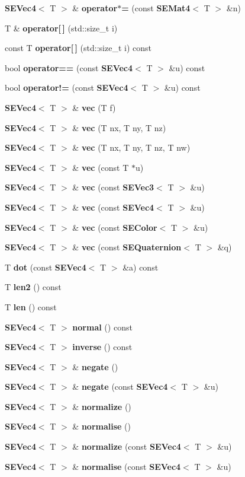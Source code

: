 \begin{DoxyCompactItemize}
\item 
{\bf S\+E\+Vec4}$<$ T $>$ \& {\bf operator$\ast$=} (const {\bf S\+E\+Mat4}$<$ T $>$ \&n)
\item 
T \& {\bf operator[$\,$]} (std\+::size\+\_\+t i)
\item 
const T {\bf operator[$\,$]} (std\+::size\+\_\+t i) const 
\item 
bool {\bf operator==} (const {\bf S\+E\+Vec4}$<$ T $>$ \&u) const 
\item 
bool {\bf operator!=} (const {\bf S\+E\+Vec4}$<$ T $>$ \&u) const 
\item 
{\bf S\+E\+Vec4}$<$ T $>$ \& {\bf vec} (T f)
\item 
{\bf S\+E\+Vec4}$<$ T $>$ \& {\bf vec} (T nx, T ny, T nz)
\item 
{\bf S\+E\+Vec4}$<$ T $>$ \& {\bf vec} (T nx, T ny, T nz, T nw)
\item 
{\bf S\+E\+Vec4}$<$ T $>$ \& {\bf vec} (const T $\ast$u)
\item 
{\bf S\+E\+Vec4}$<$ T $>$ \& {\bf vec} (const {\bf S\+E\+Vec3}$<$ T $>$ \&u)
\item 
{\bf S\+E\+Vec4}$<$ T $>$ \& {\bf vec} (const {\bf S\+E\+Vec4}$<$ T $>$ \&u)
\item 
{\bf S\+E\+Vec4}$<$ T $>$ \& {\bf vec} (const {\bf S\+E\+Color}$<$ T $>$ \&u)
\item 
{\bf S\+E\+Vec4}$<$ T $>$ \& {\bf vec} (const {\bf S\+E\+Quaternion}$<$ T $>$ \&q)
\item 
T {\bf dot} (const {\bf S\+E\+Vec4}$<$ T $>$ \&a) const 
\item 
T {\bf len2} () const 
\item 
T {\bf len} () const 
\item 
{\bf S\+E\+Vec4}$<$ T $>$ {\bf normal} () const 
\item 
{\bf S\+E\+Vec4}$<$ T $>$ {\bf inverse} () const 
\item 
{\bf S\+E\+Vec4}$<$ T $>$ \& {\bf negate} ()
\item 
{\bf S\+E\+Vec4}$<$ T $>$ \& {\bf negate} (const {\bf S\+E\+Vec4}$<$ T $>$ \&u)
\item 
{\bf S\+E\+Vec4}$<$ T $>$ \& {\bf normalize} ()
\item 
{\bf S\+E\+Vec4}$<$ T $>$ \& {\bf normalise} ()
\item 
{\bf S\+E\+Vec4}$<$ T $>$ \& {\bf normalize} (const {\bf S\+E\+Vec4}$<$ T $>$ \&u)
\item 
{\bf S\+E\+Vec4}$<$ T $>$ \& {\bf normalise} (const {\bf S\+E\+Vec4}$<$ T $>$ \&u)
\item 

\end{DoxyCompactItemize}
